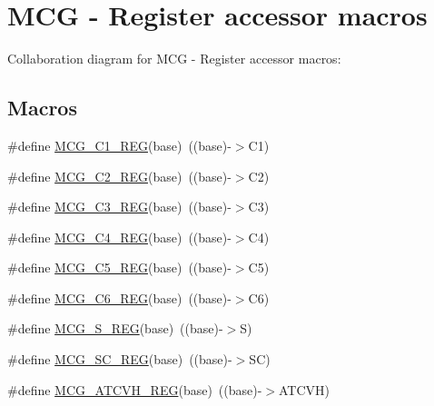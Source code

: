 \hypertarget{group___m_c_g___register___accessor___macros}{}\section{M\+CG -\/ Register accessor macros}
\label{group___m_c_g___register___accessor___macros}
Collaboration diagram for M\+CG -\/ Register accessor macros\+:
\subsection*{Macros}
\begin{DoxyCompactItemize}
\item 
\#define \hyperlink{group___m_c_g___register___accessor___macros_ga8bae88afeec8abab181383a6e5a9fecb}{M\+C\+G\+\_\+\+C1\+\_\+\+R\+EG}(base)~((base)-\/$>$C1)
\item 
\#define \hyperlink{group___m_c_g___register___accessor___macros_ga1fe49262912ac579f147ae5c2cfde5a5}{M\+C\+G\+\_\+\+C2\+\_\+\+R\+EG}(base)~((base)-\/$>$C2)
\item 
\#define \hyperlink{group___m_c_g___register___accessor___macros_ga7ead9604d56b0f9d04a297a8ddad2bfd}{M\+C\+G\+\_\+\+C3\+\_\+\+R\+EG}(base)~((base)-\/$>$C3)
\item 
\#define \hyperlink{group___m_c_g___register___accessor___macros_ga7ecd15c7ea67a8febfe9fb84044905c8}{M\+C\+G\+\_\+\+C4\+\_\+\+R\+EG}(base)~((base)-\/$>$C4)
\item 
\#define \hyperlink{group___m_c_g___register___accessor___macros_ga8d61340716746b32bbf9dc08f45bd8f6}{M\+C\+G\+\_\+\+C5\+\_\+\+R\+EG}(base)~((base)-\/$>$C5)
\item 
\#define \hyperlink{group___m_c_g___register___accessor___macros_ga900a3edcbbfc2933afe2a26c6774fd69}{M\+C\+G\+\_\+\+C6\+\_\+\+R\+EG}(base)~((base)-\/$>$C6)
\item 
\#define \hyperlink{group___m_c_g___register___accessor___macros_gac8e21014738ce19fa716fe2ee80f1a64}{M\+C\+G\+\_\+\+S\+\_\+\+R\+EG}(base)~((base)-\/$>$S)
\item 
\#define \hyperlink{group___m_c_g___register___accessor___macros_gaccd64981395ccd3872a484806162a8ac}{M\+C\+G\+\_\+\+S\+C\+\_\+\+R\+EG}(base)~((base)-\/$>$SC)
\item 
\#define \hyperlink{group___m_c_g___register___accessor___macros_gaca17ff8b94752a7700acc7adc7e462ea}{M\+C\+G\+\_\+\+A\+T\+C\+V\+H\+\_\+\+R\+EG}(base)~((base)-\/$>$A\+T\+C\+VH)
\item 

\end{DoxyCompactItemize}

